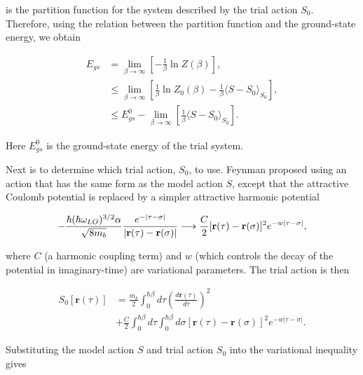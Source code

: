 is the partition function for the system described by the trial action $S_0$. Therefore, using the relation between the partition function and the ground-state energy, we obtain 

\begin{equation}
\begin{aligned}
    E_{gs} &= \lim_{\beta \to \infty} \left[-\frac{1}{\beta} \ln Z(\beta) \right] , \\
    &\leq \lim_{\beta \to \infty} \left[ \frac{1}{\beta} \ln Z_0(\beta) - \frac{1}{\beta} \langle S-S_0 \rangle_{S_0} \right] , \\ 
    &\leq E^0_{gs} - \lim_{\beta \to \infty} \left[ \frac{1}{\beta} \langle S-S_0 \rangle_{S_0} \right] .
\end{aligned}
\end{equation}

Here $E^0_{gs}$ is the ground-state energy of the trial system. 

Next is to determine which trial action, $S_0$, to use. Feynman proposed using an action that has the same form as the model action $S$, except that the attractive Coulomb potential is replaced by a simpler attractive harmonic potential 

\begin{equation}
     - \frac{ \hbar (\hbar \omega_{LO})^{3/2} \alpha}{\sqrt{8 m_b}} \frac{e^{-|\tau - \sigma|}}{|\mathbf{r}(\tau) - \mathbf{r}(\sigma)|} \longrightarrow \frac{C}{2} [\vb{r}(\tau) - \vb{r}(\sigma)]^2 e^{-w\abs{\tau - \sigma}},
\end{equation}

where $C$ (a harmonic coupling term) and $w$ (which controls the decay of the potential in imaginary-time) are variational parameters. The trial action is then

\begin{equation}
\begin{aligned}
        S_0[\mathbf{r}(\tau)] &= \frac{m_b}{2}\int^{\hbar\beta}_0 d\tau \left(\frac{d\mathbf{r}(\tau)}{d\tau}\right)^2\\
        &+ \frac{C}{2} \int^{\hbar\beta}_0 d\tau \int^{\hbar\beta}_0 d\sigma \left[\mathbf{r}(\tau) - \mathbf{r}(\sigma)\right]^2 e^{-w|\tau - \sigma|} .
\label{eqn:athermal_trial_action}
\end{aligned}
\end{equation}

Substituting the model action $S$ and trial action $S_0$ into the variational inequality gives

